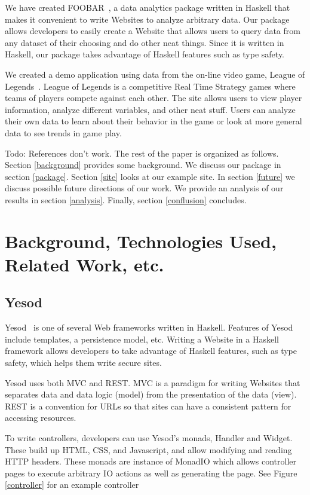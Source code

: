 \documentclass{chi2009}
\begin{document}
We have created FOOBAR~\cite{foobar}, a data analytics package written in Haskell that makes it convenient to write Websites to analyze arbitrary data. Our package allows developers to easily create a Website that allows users to query data from any dataset of their choosing and do other neat things. Since it is written in Haskell, our package takes advantage of Haskell features such as type safety. 

We created  a demo application using data from the on-line video game, League of Legends~\cite{lol}. League of Legends is a competitive Real Time Strategy games where teams of players compete against each other. The site allows users to view player information, analyze different variables, and other neat stuff. Users can analyze their own data to learn about their behavior in the game or look at more general data to see trends in game play. 

Todo: References don't work.
The rest of the paper is organized as follows. Section \ref{background} provides some background. We discuss our package in section \ref{package}. Section \ref{site} looks at our example site. In section \ref{future} we discuss possible future directions of our work. We provide an analysis of our results in section \ref{analysis}. Finally, section \ref{conflusion} concludes.

\section{Background, Technologies Used, Related Work, etc.}
\label{sec:background}

\subsection{Yesod}

Yesod~\cite{yesod} is one of several Web frameworks written in Haskell. Features of Yesod include templates, a persistence model, etc. Writing a Website in a Haskell framework allows developers to take advantage of Haskell features, such as type safety, which helps them write secure sites.

Yesod uses both MVC and REST. MVC is a paradigm for writing Websites that separates data and data logic (model) from the presentation of the data (view). REST is a convention for URLs so that sites can have a consistent pattern for accessing resources. 

To write controllers, developers can use Yesod's monads, Handler and Widget. These build up HTML, CSS, and Javascript, and allow modifying and reading HTTP headers. These monads are instance of MonadIO which allows controller pages to execute arbitrary IO actions as well as generating the page. See Figure \ref{controller} for an example controller 
\end{document}
